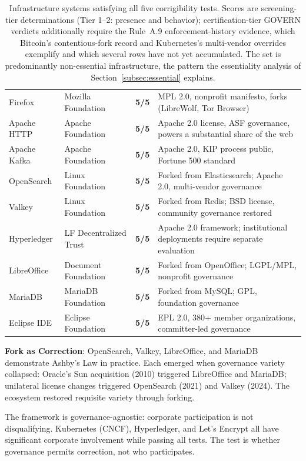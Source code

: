 \documentclass{article}
\begin{document}
\begin{table}[htbp]
\begin{tabular}{@{}l>{\raggedright}p{3.2cm}>{\centering\arraybackslash}p{1.2cm}p{5.8cm}@{}}
Firefox & Mozilla Foundation & \textbf{5/5} & MPL 2.0, nonprofit manifesto, forks (LibreWolf, Tor Browser) \\
\rowcolor{green!8}
Apache HTTP & Apache Foundation & \textbf{5/5} & Apache 2.0 license, ASF governance, powers a substantial share of the web \\
Apache Kafka & Apache Foundation & \textbf{5/5} & Apache 2.0, KIP process public, Fortune 500 standard \\
\rowcolor{green!8}
OpenSearch & Linux Foundation & \textbf{5/5} & Forked from Elasticsearch; Apache 2.0, multi-vendor governance \\
Valkey & Linux Foundation & \textbf{5/5} & Forked from Redis; BSD license, community governance restored \\
\rowcolor{green!8}
Hyperledger & LF Decentralized Trust & \textbf{5/5} & Apache 2.0 framework; institutional deployments require separate evaluation \\
LibreOffice & Document Foundation & \textbf{5/5} & Forked from OpenOffice; LGPL/MPL, nonprofit governance \\
\rowcolor{green!8}
MariaDB & MariaDB Foundation & \textbf{5/5} & Forked from MySQL; GPL, foundation governance \\
Eclipse IDE & Eclipse Foundation & \textbf{5/5} & EPL 2.0, 380+ member organizations, committer-led governance \\
\bottomrule
\end{tabular}
\caption{Infrastructure systems satisfying all five corrigibility tests. Scores are screening-tier determinations (Tier 1--2: presence and behavior); certification-tier GOVERN verdicts additionally require the Rule~A.9 enforcement-history evidence, which Bitcoin's contentious-fork record and Kubernetes's multi-vendor overrides exemplify and which several rows have not yet accumulated. The set is predominantly non-essential infrastructure, the pattern the essentiality analysis of Section~\ref{subsec:essential} explains.}
\label{tab:positive}
\end{table}

\textbf{Fork as Correction}: OpenSearch, Valkey, LibreOffice, and MariaDB demonstrate Ashby's Law in practice. Each emerged when governance variety collapsed: Oracle's Sun acquisition (2010) triggered LibreOffice and MariaDB; unilateral license changes triggered OpenSearch (2021) and Valkey (2024). The ecosystem restored requisite variety through forking.

The framework is governance-agnostic: corporate participation is not disqualifying. Kubernetes (CNCF), Hyperledger, and Let's Encrypt all have significant corporate involvement while passing all tests. The test is whether governance permits correction, not who participates.
\end{document}
